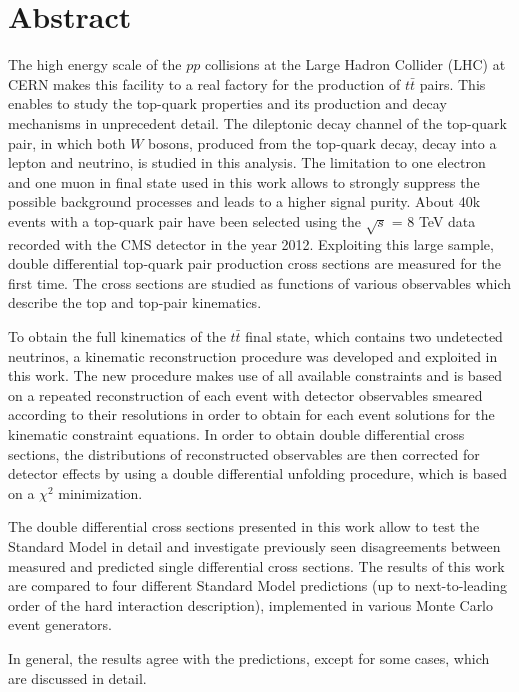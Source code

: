 \thispagestyle{empty}
\vspace{-3cm}
\section*{\centering Abstract}

\vspace{\baselineskip}

The high energy scale of the $pp$ collisions at the Large Hadron Collider (LHC) at CERN makes this facility
to a real factory for the production of $t\bar{t}$ pairs. This enables to study the top-quark 
properties and its production and decay mechanisms in unprecedent detail. The dileptonic decay channel of the
top-quark pair, in which both $W$ bosons, produced from the top-quark decay, decay into a lepton and neutrino,
is studied in this analysis. The limitation to one electron and one muon in final state 
used in this work allows to strongly suppress the possible background processes and leads to a higher
signal purity.
About 40k events with a 
top-quark pair have been selected using the $\sqrt{s}$ = 8 TeV data recorded with the CMS detector 
in the year 2012. Exploiting this large sample, double differential top-quark pair production 
cross sections are measured for the first time. The cross sections are studied as functions of
various observables which describe the top and top-pair kinematics. 

To obtain the full kinematics of the $t\bar{t}$ final state, which contains two undetected neutrinos,
a kinematic reconstruction procedure was developed and exploited in this work. The new procedure makes
use of all available constraints and is based on a repeated reconstruction of each event with detector 
observables smeared according to their resolutions in order to obtain for each event solutions for the
kinematic constraint equations. In order to obtain
double differential cross sections, the distributions of reconstructed observables
are then corrected for detector effects by using a double differential unfolding procedure, which is
based on a $\chi^{2}$ minimization.

The double differential cross sections presented in this work allow to test the Standard Model 
in detail and investigate previously seen disagreements between measured and predicted single differential cross sections.
The results of this work are compared to four different Standard Model predictions (up to next-to-leading order
of the hard interaction description), implemented in various Monte Carlo event generators.

In general, the results agree with the predictions, except for some cases, which are discussed
in detail.

\clearpage